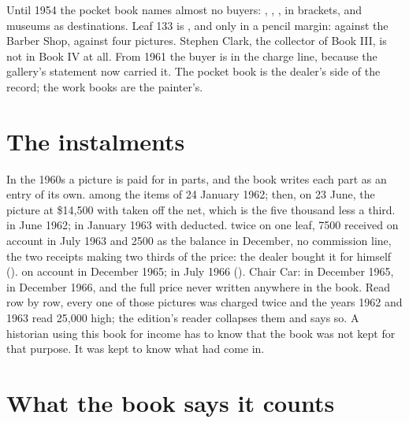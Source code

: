 Until 1954 the pocket book names almost no buyers: , , , in brackets, and museums as destinations. Leaf 133 is , and only in a pencil margin:  against the Barber Shop,  against four pictures. Stephen Clark, the collector of Book III, is not in Book IV at all. From 1961 the buyer is in the charge line, because the gallery's statement now carried it. The pocket book is the dealer's side of the record; the work books are the painter's.

\section{The instalments}

In the 1960s a picture is paid for in parts, and the book writes each part as an entry of its own.  among the items of 24 January 1962; then, on 23 June, the picture at \$14,500 with  taken off the net, which is the five thousand less a third.  in June 1962;  in January 1963 with  deducted.  twice on one leaf, 7500 received on account in July 1963 and 2500 as the balance in December, no commission line, the two receipts making two thirds of the price: the dealer bought it for himself ().  on account in December 1965;  in July 1966 (). Chair Car:  in December 1965,  in December 1966, and the full price never written anywhere in the book. Read row by row, every one of those pictures was charged twice and the years 1962 and 1963 read 25,000 high; the edition's reader collapses them and says so. A historian using this book for income has to know that the book was not kept for that purpose. It was kept to know what had come in.

\section{What the book says it counts}

